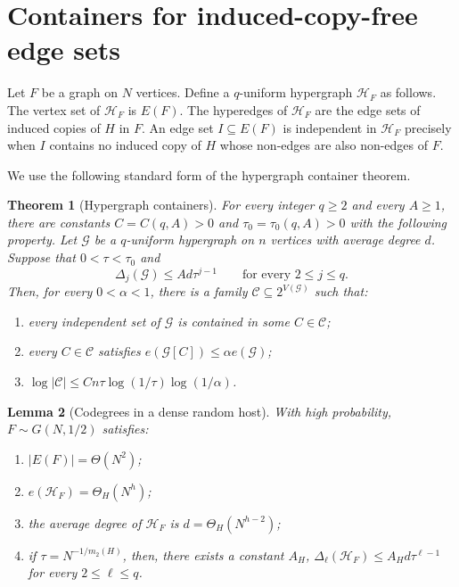 \documentclass[11pt,reqno]{amsart}
\numberwithin{equation}{section}
\theoremstyle{plain}
\newtheorem{theorem}{Theorem}[section]
\newtheorem{lemma}[theorem]{Lemma}
\theoremstyle{definition}
\newcommand{\calC}{\mathcal C}
\newcommand{\calH}{\mathcal H}
\newcommand{\calG}{\mathcal G}
\begin{document}
\section{Containers for induced-copy-free edge sets}

Let $F$ be a graph on $N$ vertices.  Define a $q$-uniform hypergraph
$\calH_F$ as follows.  The vertex set of $\calH_F$ is $E(F)$.  The
hyperedges of $\calH_F$ are the edge sets of induced copies of $H$ in
$F$.  An edge set $I\subseteq E(F)$ is independent in $\calH_F$ precisely
when $I$ contains no induced copy of $H$ whose non-edges are also non-edges
of $F$.

We use the following standard form of the hypergraph container theorem.

\begin{theorem}[Hypergraph containers]
\label{thm:containers}
For every integer $q\ge2$ and every $A\ge1$, there are constants
$C=C(q,A)>0$ and $\tau_0=\tau_0(q,A)>0$ with the following property.  Let
$\calG$ be a $q$-uniform hypergraph on $n$ vertices with average degree
$d$.  Suppose that $0<\tau<\tau_0$ and
$$
        \Delta_j(\calG)\le A d\tau^{j-1}
        \qquad\text{for every }2\le j\le q.
$$
Then, for every $0<\alpha<1$, there is a family
$\calC\subseteq2^{V(\calG)}$ such that:
\begin{enumerate}[label=\textup{(\arabic*)}]
\item every independent set of $\calG$ is contained in some $C\in\calC$;
\item every $C\in\calC$ satisfies $e(\calG[C])\le \alpha e(\calG)$;
\item
$\log |\calC|\le Cn\tau\log(1/\tau)\log(1/\alpha)$.

\end{enumerate}
\end{theorem}

\begin{lemma}[Codegrees in a dense random host]
\label{lem:codegrees}
With high probability, $F\sim G(N,1/2)$ satisfies:
\begin{enumerate}[label=\textup{(\arabic*)}]
\item $|E(F)|=\Theta(N^2)$;
\item $e(\calH_F)=\Theta_H(N^h)$;
\item the average degree of $\calH_F$ is $d=\Theta_H(N^{h-2})$;
\item if $\tau=N^{-1/m_2(H)}$, then, there exists a constant $A_H$,
$ \Delta_\ell(\calH_F)\le A_H d\tau^{\ell-1}$ for every $2\le \ell\le q$.
\end{enumerate}
\end{lemma}
\end{document}
